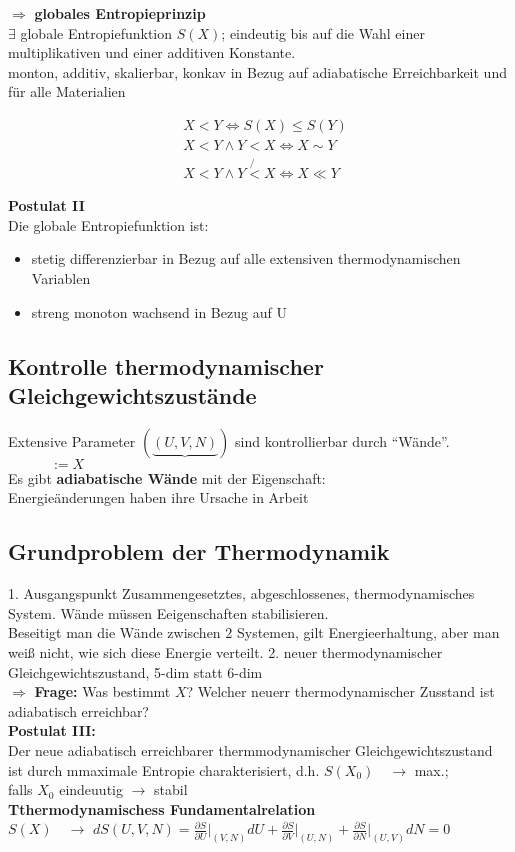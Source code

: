 \documentclass[10pt,article,colorback,accentcolor=tud9d]{tudreport}
\begin{document}
$\Rightarrow$ \textbf{globales Entropieprinzip}\\
$\exists$ globale Entropiefunktion $S(X)$; eindeutig bis auf die Wahl einer multiplikativen und einer additiven Konstante.\\
monton, additiv, skalierbar, konkav in Bezug auf adiabatische Erreichbarkeit und für alle Materialien
\begin{fleqn}
\begin{equation}
\begin{aligned}
&X<Y \Leftrightarrow S(X) \leq S(Y)\\
&X<Y \wedge Y<X \Leftrightarrow X \sim Y\\
&X<Y \wedge Y\not{<}X \Leftrightarrow X \ll Y
\end{aligned}
\end{equation}
\end{fleqn}
\textbf{Postulat II}\\
Die globale Entropiefunktion ist:
\begin{itemize}
\item stetig differenzierbar in Bezug auf alle extensiven thermodynamischen Variablen
\item streng monoton wachsend in Bezug auf U
\end{itemize}
\subsection{Kontrolle thermodynamischer Gleichgewichtszustände}
 Extensive Parameter $(\underbrace{(U,V,N)})$ sind kontrollierbar durch ``Wände''.\\
 $\quad \quad \quad:=X$\\
 Es gibt \textbf{adiabatische Wände} mit der Eigenschaft:\\
 Energieänderungen haben ihre Ursache in Arbeit
 \subsection{Grundproblem der Thermodynamik}
 1. Ausgangspunkt Zusammengesetztes, abgeschlossenes, thermodynamisches System. Wände müssen Eeigenschaften stabilisieren.\\
 Beseitigt man die Wände zwischen  2 Systemen, gilt Energieerhaltung, aber man weiß nicht, wie sich diese Energie verteilt.
 2. neuer thermodynamischer Gleichgewichtszustand, 5-dim statt 6-dim\\
 $\Rightarrow$ \textbf{Frage:} Was bestimmt $X$? Welcher neuerr thermodynamischer Zusstand ist adiabatisch erreichbar?\\
 \textbf{Postulat III:}\\
 Der neue adiabatisch erreichbarer thermmodynamischer Gleichgewichtszustand ist durch mmaximale Entropie charakterisiert,
 d.h. $S(X_0) \quad \rightarrow$  max.;\\
 falls $X_0$ eindeuutig $\rightarrow$  stabil\\
 \textbf{Tthermodynamischess Fundamentalrelation}\\
 $S(X) \quad \rightarrow$ $dS(U,V,N)= \frac{\partial S}{\partial U}\left.\right|_{(V,N)} dU  + \frac{\partial S}{\partial V}\left.\right|_{(U,N)} + \frac{\partial  S}{\partial N}\left.\right|_{(U,V)} dN =0$
\end{document}

